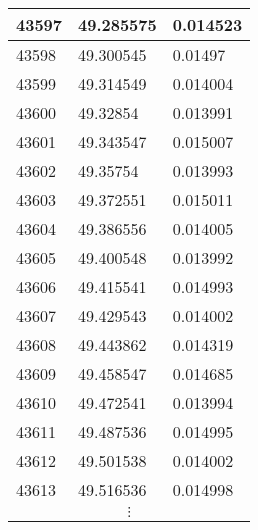 \documentclass[a4paper,9pt]{beamer}
\begin{document}
{\begin{table}[htbp]
\begin{minipage}{0.4\linewidth}
\begin{tabular}{|l|l|l|}
43597&49.285575&0.014523\\
\hline
43598&49.300545&\cellcolor {yellow}0.01497\\
\hline
43599&49.314549&\cellcolor {yellow}0.014004\\
\hline
43600&49.32854&\cellcolor {yellow}0.013991\\
\hline
43601&49.343547&\cellcolor {yellow}0.015007\\
\hline
43602&49.35754&\cellcolor {yellow}0.013993\\
\hline
43603&49.372551&\cellcolor {yellow}0.015011\\
\hline
43604&49.386556&\cellcolor {yellow}0.014005\\
\hline
43605&49.400548&\cellcolor {yellow}0.013992\\
\hline
43606&49.415541&\cellcolor {yellow}0.014993\\
\hline
43607&49.429543&\cellcolor {yellow}0.014002\\
\hline
43608&49.443862&\cellcolor {yellow}0.014319\\
\hline
43609&49.458547&\cellcolor {yellow}0.014685\\
\hline
43610&49.472541&\cellcolor {yellow}0.013994\\
\hline
43611&49.487536&\cellcolor {yellow}0.014995\\
\hline
43612&49.501538&0.014002\\
\hline
43613&49.516536&0.014998\\
\hline
\multicolumn{3}{|c|}{$\vdots$} \\
\hline

\end{tabular}
\end{minipage}
\end{table}}
\end{document}
